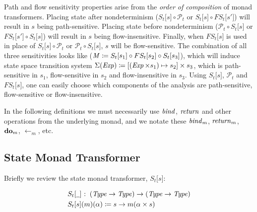 \par

Path and flow sensitivity properties arise from the \emph{order of
composition} of monad transformers. Placing state after nondeterminism
($S _t  \lbrack s \rbrack   \circ   \mathcal{P}  _t $ or
$S _t  \lbrack s \rbrack   \circ  FS _t  \lbrack s' \rbrack $) will
result in $s$ being path-sensitive. Placing state before nondeterminism
($ \mathcal{P}  _t   \circ  S _t  \lbrack s \rbrack $ or
$FS _t  \lbrack s' \rbrack   \circ  S _t  \lbrack s \rbrack $) will
result in $s$ being flow-insensitive. Finally, when
$FS _t  \lbrack s \rbrack $ is used in place of
$S _t  \lbrack s \rbrack   \circ   \mathcal{P}  _t $ or
$ \mathcal{P}  _t   \circ  S _t  \lbrack s \rbrack $, $s$ will be
flow-sensitive. The combination of all three sensitivities looks like
($ \operatorname{\mathit{M}}   \coloneqq  S _t  \lbrack s _1  \rbrack   \circ  FS _t  \lbrack s _2  \rbrack   \circ  S _t  \lbrack s _3  \rbrack $),
which will induce state space transition system
$ \Sigma  (\operatorname{\mathit{Exp}})   \coloneqq   \lbrack  (\operatorname{\mathit{Exp}}   \times  s _1 )  \mapsto  s _2  \rbrack   \times  s _3 $,
which is path-sensitive in $s _1 $, flow-sensitive in $s _2 $ and
flow-insensitive in $s _3 $. Using $S _t  \lbrack s \rbrack $,
$ \mathcal{P}  _t $ and $FS _t  \lbrack s \rbrack $, one can easily
choose which components of the analysis are path-sensitive,
flow-sensitive or flow-insensitive.

\par

In the following definitions we must necessarily use $ \operatorname{\mathit{bind}} $,
$ \operatorname{\mathit{return}} $ and other operations from the underlying monad, and we
notate these $ \operatorname{\mathit{bind}} _m  $, $ \operatorname{\mathit{return}} _m  $,
$ \operatorname{\mathtt{\boldsymbol{\mathbf{do}}}} _m  $, $ \leftarrow  _m $, etc.

\par

\subsection{State Monad Transformer}\label{state-monad-transformer}

\par

Briefly we review the state monad transformer,
$S _t  \lbrack s \rbrack $:

\small\begin{align*}
&\hspace{0em} S _t  \lbrack  \underline{\hspace{0.5em}}  \rbrack   \mathbin{\colon}   (\operatorname{\mathit{Type}}   \rightarrow   \operatorname{\mathit{Type}})   \rightarrow   (\operatorname{\mathit{Type}}   \rightarrow   \operatorname{\mathit{Type}})  \\
&\hspace{0em} S _t  \lbrack s \rbrack (m)( \alpha )  \coloneqq  s  \rightarrow  m( \alpha   \times  s)
\end{align*}\normalsize

